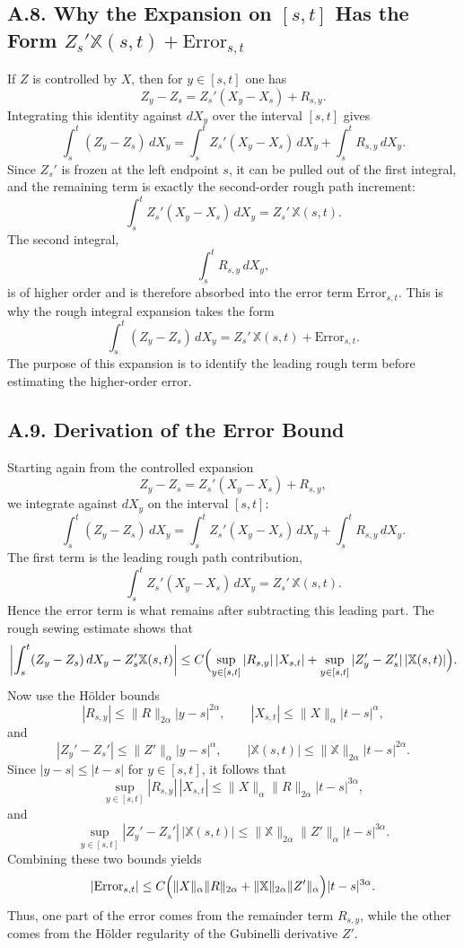 \documentclass[11pt]{article}
\theoremstyle{definition}
\theoremstyle{remark}
\begin{document}
\subsection*{A.8. Why the Expansion on $[s,t]$ Has the Form $Z_s'\mathbb X(s,t)+\mathrm{Error}_{s,t}$}
If $Z$ is controlled by $X$, then for $y\in[s,t]$ one has
\[
Z_y-Z_s
=
Z_s'(X_y-X_s)+R_{s,y}.
\]
Integrating this identity against $dX_y$ over the interval $[s,t]$ gives
\[
\int_s^t (Z_y-Z_s)\,dX_y
=
\int_s^t Z_s'(X_y-X_s)\,dX_y
+
\int_s^t R_{s,y}\,dX_y.
\]
Since $Z_s'$ is frozen at the left endpoint $s$, it can be pulled out of the first integral, and the remaining term is exactly the second-order rough path increment:
\[
\int_s^t Z_s'(X_y-X_s)\,dX_y
=
Z_s'\,\mathbb X(s,t).
\]
The second integral,
\[
\int_s^t R_{s,y}\,dX_y,
\]
is of higher order and is therefore absorbed into the error term $\mathrm{Error}_{s,t}$. This is why the rough integral expansion takes the form
\[
\int_s^t (Z_y-Z_s)\,dX_y
=
Z_s'\,\mathbb X(s,t)+\mathrm{Error}_{s,t}.
\]
The purpose of this expansion is to identify the leading rough term before estimating the higher-order error.

\subsection*{A.9. Derivation of the Error Bound}
Starting again from the controlled expansion
\[
Z_y-Z_s
=
Z_s'(X_y-X_s)+R_{s,y},
\]
we integrate against $dX_y$ on the interval $[s,t]$:
\[
\int_s^t (Z_y-Z_s)\,dX_y
=
\int_s^t Z_s'(X_y-X_s)\,dX_y
+
\int_s^t R_{s,y}\,dX_y.
\]
The first term is the leading rough path contribution,
\[
\int_s^t Z_s'(X_y-X_s)\,dX_y
=
Z_s'\,\mathbb X(s,t).
\]
Hence the error term is what remains after subtracting this leading part. The rough sewing estimate shows that
\[
\left|
\int_s^t (Z_y-Z_s)\,dX_y - Z_s'\mathbb X(s,t)
\right|
\le
C\Bigl(
\sup_{y\in[s,t]}|R_{s,y}|\,|X_{s,t}|
+
\sup_{y\in[s,t]}|Z_y'-Z_s'|\,|\mathbb X(s,t)|
\Bigr).
\]
Now use the H\"older bounds
\[
|R_{s,y}|
\le
\|R\|_{2\alpha}|y-s|^{2\alpha},
\qquad
|X_{s,t}|
\le
\|X\|_{\alpha}|t-s|^{\alpha},
\]
and
\[
|Z_y'-Z_s'|
\le
\|Z'\|_{\alpha}|y-s|^{\alpha},
\qquad
|\mathbb X(s,t)|
\le
\|\mathbb X\|_{2\alpha}|t-s|^{2\alpha}.
\]
Since $|y-s|\le |t-s|$ for $y\in[s,t]$, it follows that
\[
\sup_{y\in[s,t]}|R_{s,y}|\,|X_{s,t}|
\le
\|X\|_{\alpha}\|R\|_{2\alpha}|t-s|^{3\alpha},
\]
and
\[
\sup_{y\in[s,t]}|Z_y'-Z_s'|\,|\mathbb X(s,t)|
\le
\|\mathbb X\|_{2\alpha}\|Z'\|_{\alpha}|t-s|^{3\alpha}.
\]
Combining these two bounds yields
\[
|\mathrm{Error}_{s,t}|
\le
C\Bigl(
\|X\|_{\alpha}\|R\|_{2\alpha}
+
\|\mathbb X\|_{2\alpha}\|Z'\|_{\alpha}
\Bigr)|t-s|^{3\alpha}.
\]
Thus, one part of the error comes from the remainder term $R_{s,y}$, while the other comes from the H\"older regularity of the Gubinelli derivative $Z'$.
\end{document}
